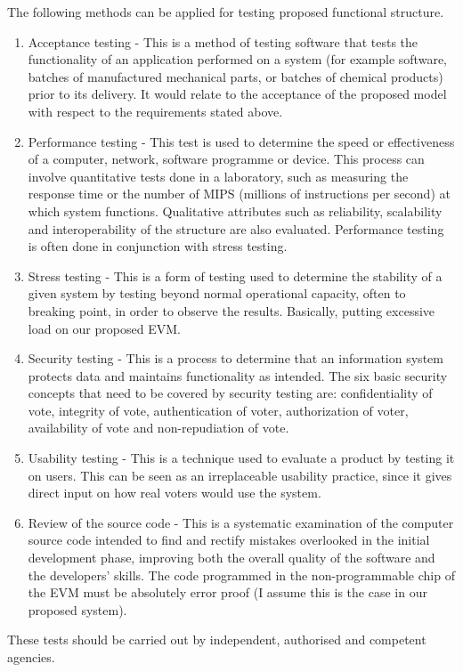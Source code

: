 \documentclass{article}
\begin{document}
The following methods can be applied for testing proposed functional structure.
\begin{enumerate}  
\item Acceptance testing - This is a method of testing software that tests the functionality of an application performed on a system (for example software, batches of manufactured mechanical parts, or batches of chemical products) prior to its delivery. It would relate to the acceptance of the proposed model with respect to the requirements stated above. 
\item Performance testing - This test is used to determine the speed or effectiveness of a computer, network, software programme or device. This process can involve quantitative tests done in a laboratory, such as measuring the response time or the number of MIPS (millions of instructions per second) at which system functions. Qualitative attributes such as reliability, scalability and interoperability of the structure are also evaluated. Performance testing is often done in conjunction with stress testing. 
\item Stress testing - This is a form of testing used to determine the stability of a given system by testing beyond normal operational capacity, often to breaking point, in order to observe the results. Basically, putting excessive load on our proposed EVM. 
\item Security testing - This is a process to determine that an information system protects data and maintains functionality as intended. The six basic security concepts that need to be covered by security testing are: confidentiality of vote, integrity of vote, authentication of voter, authorization of voter, availability of vote and non-repudiation of vote. 
\item Usability testing - This is a technique used to evaluate a product by testing it on users. This can be seen as an irreplaceable usability practice, since it gives direct input on how real voters would use the system. 
\item Review of the source code - This is a systematic examination of the computer source code intended to find and rectify mistakes overlooked in the initial development phase, improving both the overall quality of the software and the developers’ skills. The code programmed in the non-programmable chip of the EVM must be absolutely error proof (I assume this is the case in our proposed system).
\end{enumerate}
These tests should be carried out by independent, authorised and competent agencies. 
\end{document}
